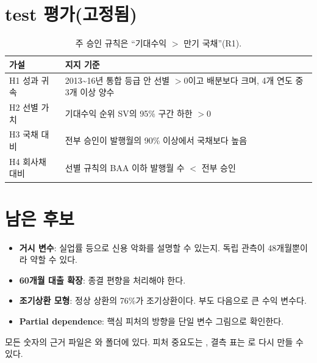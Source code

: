 \section{test 평가(고정됨)}
\begin{table}[H]\centering\small
\begin{tabularx}{\linewidth}{@{}lL@{}}\toprule
가설 & 지지 기준\\\midrule
H1 성과 귀속 & 2013\textasciitilde 16년 통합 등급 안 선별 $>0$이고 배분보다 크며, 4개 연도 중 3개 이상 양수\\
H2 선별 가치 & 기대수익 순위 SV의 95\% 구간 하한 $>0$\\
H3 국채 대비 & 전부 승인이 발행월의 90\% 이상에서 국채보다 높음\\
H4 회사채 대비 & 선별 규칙의 BAA 이하 발행월 수 $<$ 전부 승인\\\bottomrule
\end{tabularx}
\caption{주 승인 규칙은 ``기대수익 $>$ 만기 국채''(R1).}
\end{table}

\section{남은 후보}
\begin{itemize}
\item \textbf{거시 변수}: 실업률 등으로 신용 악화를 설명할 수 있는지. 독립 관측이 48개월뿐이라 약할 수 있다.
\item \textbf{60개월 대출 확장}: 종결 편향을 처리해야 한다.
\item \textbf{조기상환 모형}: 정상 상환의 76\%가 조기상환이다. 부도 다음으로 큰 수익 변수다.
\item \textbf{Partial dependence}: 핵심 피처의 방향을 단일 변수 그림으로 확인한다.
\end{itemize}

\begin{insight}[이 문서의 숫자]
모든 숫자의 근거 파일은 와  폴더에 있다. 피처 중요도는 , 결측 표는 로 다시 만들 수 있다.
\end{insight}


